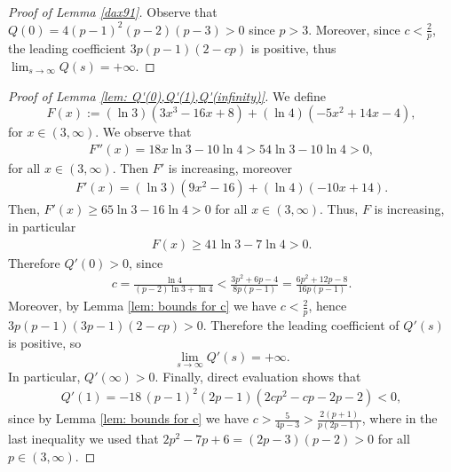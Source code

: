 \documentclass[11pt]{article}
\theoremstyle{definition}
\newcommand{\1}{\mathbf{1}}
\begin{document}
\begin{proof}[Proof of Lemma \ref{dax91}]
Observe that $Q(0)=4(p-1)^2(p-2)(p-3)>0$ since $p>3$. Moreover, since $c<\frac{2}{p}$, the leading coefficient $3p(p-1)(2-cp)$ is positive, thus $\lim_{s \to \infty}Q(s)=+\infty$. 
\end{proof}

\begin{proof}[Proof of Lemma \ref{lem: Q'(0),Q'(1),Q'(infinity)}]
We define 
\begin{equation*}
    F(x):=(\ln 3)(3x^3-16x+8)+(\ln 4)(-5x^2+14x-4), 
\end{equation*}
for $x\in(3,\infty)$. We observe that
\begin{align*}
    F''(x)=18x\ln 3-10\ln 4>54\ln 3-10\ln 4>0, 
\end{align*}
for all $x\in(3,\infty)$. Then $F'$ is increasing, moreover
\begin{align*}
    F'(x)=(\ln 3)(9x^2-16)+(\ln 4)(-10x+14).
\end{align*}
Then, $F'(x)\geq 65\ln 3-16\ln 4>0$ for all $x\in(3,\infty)$. Thus, $F$ is increasing, in particular
\begin{align*}
    F(x)\geq 41\ln 3-7\ln 4>0.
\end{align*}
Therefore $Q'(0)>0$, since
\begin{align*}
    c=\frac{\ln 4}{(p-2)\ln 3+\ln 4}<\frac{3p^2+6p-4}{8p(p-1)}=\frac{6p^2+12p-8}{16p(p-1)}.
\end{align*}
Moreover, by Lemma \ref{lem: bounds for c} we have $c<\frac{2}{p}$, hence
$3p(p-1)(3p-1)(2-cp)>0$. Therefore the leading coefficient of $Q'(s)$ is positive, so
\[
\lim_{s\to\infty} Q'(s)=+\infty.
\]
In particular, $Q'(\infty)>0$.
Finally, direct evaluation shows that 
\begin{align*}
Q'(1)=-18\,(p-1)^2(2p-1)(2cp^2-cp-2p-2)<0,
\end{align*}
since by Lemma \ref{lem: bounds for c} we have $c>\frac{5}{4p-3}>\frac{2(p+1)}{p(2p-1)}$, where in the last inequality we used that $2p^2-7p+6=(2p-3)(p-2)>0$ for all $p\in(3,\infty)$.
\end{proof}
\end{document}
